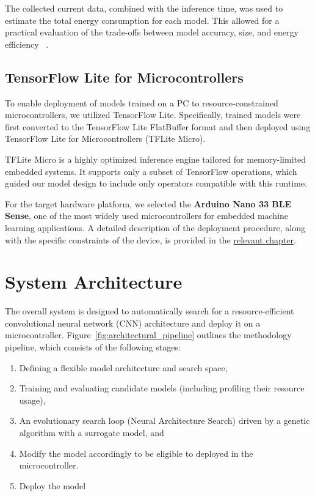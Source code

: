 The collected current data, combined with the inference time, was used to estimate the total energy consumption for each model. This allowed for a practical evaluation of the trade-offs between model accuracy, size, and energy efficiency ~\cite{nordicPPK2}.

\subsection*{TensorFlow Lite for Microcontrollers}

To enable deployment of models trained on a PC to resource-constrained microcontrollers, we utilized TensorFlow Lite. Specifically, trained models were first converted to the TensorFlow Lite FlatBuffer format and then deployed using TensorFlow Lite for Microcontrollers (TFLite Micro).

TFLite Micro is a highly optimized inference engine tailored for memory-limited embedded systems. It supports only a subset of TensorFlow operations, which guided our model design to include only operators compatible with this runtime.

For the target hardware platform, we selected the \textbf{Arduino Nano 33 BLE Sense}, one of the most widely used microcontrollers for embedded machine learning applications. A detailed description of the deployment procedure, along with the specific constraints of the device, is provided in the \hyperref[chap:DeploymentEnvironment]{relevant chapter}.


\section{System Architecture}

The overall system is designed to automatically search for a resource-efficient convolutional neural network (CNN) architecture and deploy it on a microcontroller. Figure~\ref{fig:architectural_pipeline} outlines the methodology pipeline, which consists of the following stages: 

\begin{enumerate}
    \item Defining a flexible model architecture and search space,
    \item Training and evaluating candidate models (including profiling their resource usage),
    \item An evolutionary search loop (Neural Architecture Search) driven by a genetic algorithm with a surrogate model, and
    \item Modify the model accordingly to be eligible to deployed in the microcontroller.
    \item Deploy the model
\end{enumerate}

